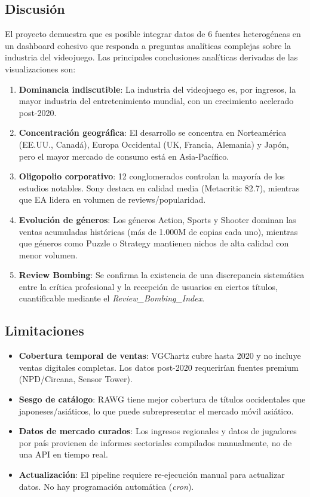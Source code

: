 \documentclass[11pt,a4paper]{article}
\begin{document}
\subsection{Discusión}

El proyecto demuestra que es posible integrar datos de 6 fuentes heterogéneas en un dashboard cohesivo que responda a preguntas analíticas complejas sobre la industria del videojuego. Las principales conclusiones analíticas derivadas de las visualizaciones son:

\begin{enumerate}
  \item \textbf{Dominancia indiscutible}: La industria del videojuego es, por ingresos, la mayor industria del entretenimiento mundial, con un crecimiento acelerado post-2020.
  \item \textbf{Concentración geográfica}: El desarrollo se concentra en Norteamérica (EE.UU., Canadá), Europa Occidental (UK, Francia, Alemania) y Japón, pero el mayor mercado de consumo está en Asia-Pacífico.
  \item \textbf{Oligopolio corporativo}: 12 conglomerados controlan la mayoría de los estudios notables. Sony destaca en calidad media (Metacritic 82.7), mientras que EA lidera en volumen de reviews/popularidad.
  \item \textbf{Evolución de géneros}: Los géneros Action, Sports y Shooter dominan las ventas acumuladas históricas (más de 1.000M de copias cada uno), mientras que géneros como Puzzle o Strategy mantienen nichos de alta calidad con menor volumen.
  \item \textbf{Review Bombing}: Se confirma la existencia de una discrepancia sistemática entre la crítica profesional y la recepción de usuarios en ciertos títulos, cuantificable mediante el \textit{Review\_Bombing\_Index}.
\end{enumerate}

\subsection{Limitaciones}

\begin{itemize}
  \item \textbf{Cobertura temporal de ventas}: VGChartz cubre hasta 2020 y no incluye ventas digitales completas. Los datos post-2020 requerirían fuentes premium (NPD/Circana, Sensor Tower).
  \item \textbf{Sesgo de catálogo}: RAWG tiene mejor cobertura de títulos occidentales que japoneses/asiáticos, lo que puede subrepresentar el mercado móvil asiático.
  \item \textbf{Datos de mercado curados}: Los ingresos regionales y datos de jugadores por país provienen de informes sectoriales compilados manualmente, no de una API en tiempo real.
  \item \textbf{Actualización}: El pipeline requiere re-ejecución manual para actualizar datos. No hay programación automática (\textit{cron}).
\end{itemize}
\end{document}
